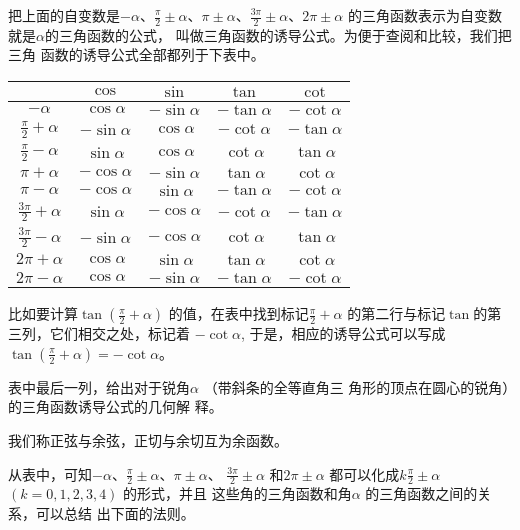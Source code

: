 把上面的自变数是$-\alpha$、$\frac{\pi}{2}\pm\alpha$、$\pi\pm\alpha$、$\frac{3\pi}{2}\pm\alpha$、$2\pi\pm\alpha$
的三角函数表示为自变数就是$\alpha$的三角函数的公式，
叫做三角函数的诱导公式。为便于查阅和比较，我们把三角
函数的诱导公式全部都列于下表中。
\begin{center}
\begin{tabular}{ccccc}
    \hline
& $\cos$ & $\sin$ & $\tan $ &  $\cot$\\
\hline
$-\alpha$& $\cos\alpha$ & $-\sin\alpha$ & $-\tan\alpha $ &  $-\cot\alpha$\\
\vspace{1ex}$\frac{\pi}{2}+\alpha$& $-\sin\alpha$ & $\cos\alpha$ & $-\cot\alpha $ &  $-\tan\alpha$\\
\vspace{1ex}$\frac{\pi}{2}-\alpha$& $\sin\alpha$ & $\cos\alpha$ & $\cot\alpha $ &  $\tan \alpha$\\
$\pi+\alpha$& $-\cos\alpha$ & $-\sin\alpha$ & $\tan\alpha $ &  $\cot\alpha$\\
$\pi-\alpha$& $-\cos\alpha$ & $\sin\alpha$ & $-\tan\alpha $ &  $-\cot\alpha$\\
\vspace{1ex}$\frac{3\pi}{2}+\alpha$& $\sin\alpha$ & $-\cos\alpha$ & $-\cot\alpha $ &  $-\tan\alpha$\\
\vspace{1ex}$\frac{3\pi}{2}-\alpha$& $-\sin\alpha$ & $-\cos\alpha$ & $\cot\alpha $ &  $\tan\alpha$\\
$2\pi+\alpha$& $\cos\alpha$ & $\sin\alpha$ & $\tan\alpha $ &  $\cot\alpha$\\
$2\pi-\alpha$& $\cos\alpha$ & $-\sin\alpha$ & $-\tan\alpha $ &  $-\cot\alpha$\\
\hline
\end{tabular}
\end{center}

比如要计算$\tan\left(\frac{\pi}{2}+\alpha\right)$
的值，在表中找到标记$\frac{\pi}{2}+\alpha$
的第二行与标记$\tan$的第三列，它们相交之处，标记着
$-\cot\alpha$, 于是，相应的诱导公式可以写成
$\tan \left(\frac{\pi}{2}+\alpha\right) =
-\cot\alpha$。

表中最后一列，给出对于锐角$\alpha$ （带斜条的全等直角三
角形的顶点在圆心的锐角）的三角函数诱导公式的几何解
释。

我们称正弦与余弦，正切与余切互为余函数。

从表中，可知$-\alpha$、$\frac{\pi}{2}\pm\alpha$、$\pi \pm\alpha$、
$\frac{3\pi}{2}\pm \alpha$ 和$2\pi \pm\alpha$ 都可以化成$k\frac{\pi}{2}
\pm\alpha$ $(k=0,1,2,3,4)$ 的形式，并且
这些角的三角函数和角$\alpha$ 的三角函数之间的关系，可以总结
出下面的法则。

